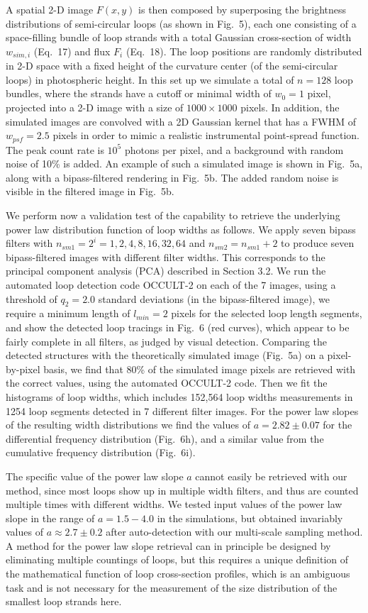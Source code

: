 \documentclass[10pt,preprint]{aastex}  %
\begin{document}
A spatial 2-D image $F(x,y)$ is then composed by superposing the
brightness distributions of semi-circular loops (as shown in Fig.~5), 
each one consisting
of a space-filling bundle of loop strands with a total 
Gaussian cross-section of width $w_{sim,i}$ (Eq.~17) and flux $F_i$ (Eq.~18). 
The loop positions are randomly distributed in 2-D space 
with a fixed height of the curvature center (of the semi-circular loops)
in photospheric height. 
In this set up we simulate a total of $n=128$ loop bundles,
where the strands have a cutoff or minimal width of $w_0=1$ pixel,
projected into a 2-D image with a size of $1000 \times 1000$ pixels. 
In addition, the simulated images are convolved with a 2D Gaussian 
kernel that has a FWHM of $w_{psf}=2.5$ pixels in order to mimic 
a realistic instrumental point-spread function.
The peak count rate is $10^5$ photons per pixel, and a background
with random noise of 10\% is added. 
An example of such a simulated image is shown in Fig.~5a, 
along with a bipass-filtered rendering in Fig.~5b. The
added random noise is visible in the filtered image in Fig.~5b.

We perform now a validation test of the capability to retrieve the
underlying power law distribution function of loop widths as follows. 
We apply seven bipass filters with $n_{sm1} = 2^i = 
1, 2, 4, 8, 16, 32, 64$ and $n_{sm2}=n_{sm1}+2$ to produce seven
bipass-filtered images with different filter widths.
This corresponds to the principal component analysis (PCA) 
described in Section 3.2. We run the automated loop detection code
OCCULT-2 on each of the 7 images, using a threshold of $q_2=2.0$
standard deviations (in the bipass-filtered image), we require
a minimum length of $l_{min}=2$ pixels for the selected loop length
segments, and show the detected loop tracings in Fig.~6 (red curves), 
which appear to be fairly complete in all filters, as judged by 
visual detection. Comparing the detected structures with the
theoretically simulated image (Fig.~5a) on a pixel-by-pixel basis,
we find that 80\% of the simulated image pixels are retrieved
with the correct values, using the automated OCCULT-2 code. 
Then we fit the histograms
of loop widths, which includes 152,564 loop widths measurements in
1254 loop segments detected in 7 different filter images.  
For the power law slopes of the resulting width distributions
we find the values of $a=2.82\pm0.07$ for the differential frequency 
distribution (Fig.~6h), and a similar value from the cumulative 
frequency distribution (Fig.~6i). 

The specific value of the power law slope $a$ cannot easily be 
retrieved with our method, since most
loops show up in multiple width filters, and thus are counted
multiple times with different widths. We tested input values
of the power law slope in the range of $a=1.5-4.0$ 
in the simulations, but obtained invariably values of 
$a \approx 2.7 \pm 0.2$ after auto-detection with 
our multi-scale sampling method. 
A method for the power law slope retrieval can in principle be
designed by eliminating multiple countings of loops, but this
requires a unique definition of the mathematical function of
loop cross-section profiles, which is an ambiguous task and 
is not necessary for the measurement of the size distribution 
of the smallest loop strands here.
\end{document}
